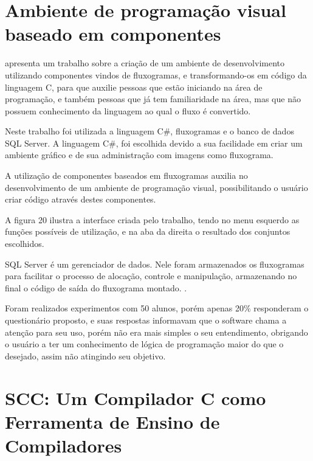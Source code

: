 \documentclass[12pt,oneside,a4paper,chapter=TITLE,section=TITLE,sumario=tradicional]{abntex2}
\begin{document}
\section{Ambiente de programação visual baseado em componentes}
\label{sec:ambiente-de-programacao-visual-baseado-em-componentes}
 
\cite{juliana2015} apresenta um trabalho sobre a criação de um ambiente de desenvolvimento utilizando componentes vindos de fluxogramas, e transformando-os em código da linguagem C, para que auxilie pessoas que estão iniciando na área de programação, e também pessoas que já tem familiaridade na área, mas que não possuem conhecimento da linguagem ao qual o fluxo é convertido.

Neste trabalho foi utilizada a linguagem C\#, fluxogramas e o banco de dados SQL Server. A linguagem C\#, foi escolhida devido a sua facilidade em criar um ambiente gráfico e de sua administração com imagens como fluxograma.

A utilização de componentes baseados em fluxogramas auxilia no desenvolvimento de um ambiente de programação visual, possibilitando o usuário criar código através destes componentes.

A figura 20 ilustra a interface criada pelo trabalho, tendo no menu esquerdo as funções possíveis de utilização, e na aba da direita o resultado dos conjuntos escolhidos. 

\begin{figure}[htb]
\end{figure}

SQL Server é um gerenciador de dados. Nele foram armazenados os fluxogramas para facilitar o processo de alocação, controle e manipulação, armazenando no final o código de saída do fluxograma montado. \cite{juliana2015}.

Foram realizados experimentos com 50 alunos, porém apenas 20\% responderam o questionário proposto, e suas respostas informavam que o software chama a atenção para seu uso, porém não era mais simples o seu entendimento, obrigando o usuário a ter um conhecimento de lógica de programação maior do que o desejado, assim não atingindo seu objetivo. 

\section{SCC: Um Compilador C como Ferramenta de Ensino de Compiladores}
\label{sec:scc}
 
\end{document}
